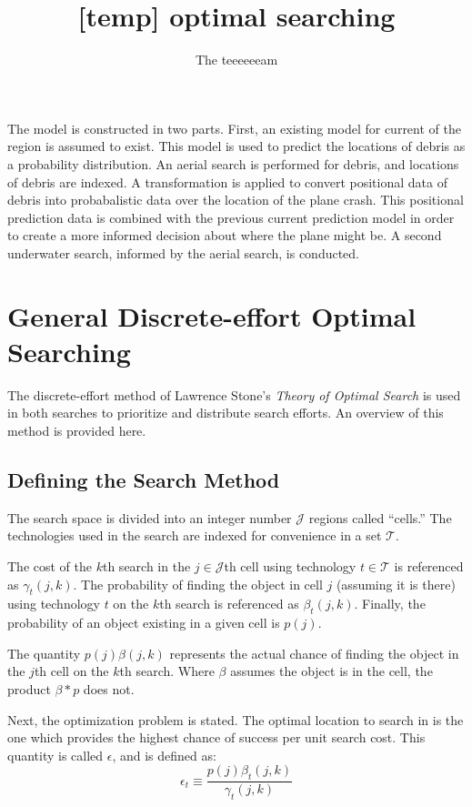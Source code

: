 \documentclass[a4paper]{article}
\title{[temp] optimal searching}
\author{The teeeeeeam}
\begin{document}
\maketitle\tableofcontents\pagebreak

The model is constructed in two parts. First, an existing model for current of the region is assumed to exist. This model is used to predict the locations of debris as a probability distribution. An aerial search is performed for debris, and locations of debris are indexed. A transformation is applied to convert positional data of debris into probabalistic data over the location of the plane crash. This positional prediction data is combined with the previous current prediction model in order to create a more informed decision about where the plane might be. A second underwater search, informed by the aerial search, is conducted.

\section{General Discrete-effort Optimal Searching}

The discrete-effort method of Lawrence Stone's \textit{Theory of Optimal Search} is used in both searches to prioritize and distribute search efforts. An overview of this method is provided here. 

\subsection{Defining the Search Method}

The search space is divided into an integer number $\mathcal{J}$ regions called ``cells.'' The technologies used in the search are indexed for convenience in a set $\mathcal{T}$. 


The cost of the $k$th search in the $j\in\mathcal{J}$th cell using technology $t\in\mathcal{T}$ is referenced as $\gamma_t(j,k)$. The probability of finding the object in cell $j$ (assuming it is there) using technology $t$ on the $k$th search is referenced as $\beta_t(j,k)$. Finally, the probability of an object existing in a given cell is $p(j)$. 

The quantity $p(j)\beta(j,k)$ represents the actual chance of finding the object in the $j$th cell on the $k$th search. Where $\beta$ assumes the object is in the cell, the product $\beta * p$ does not.

Next, the optimization problem is stated. The optimal location to search in is the one which provides the highest chance of success per unit search cost. This quantity is called $\epsilon$, and is defined as: $$\epsilon_t\equiv\frac{p(j)\beta_t(j,k)}{\gamma_t(j,k)}$$
\end{document}
